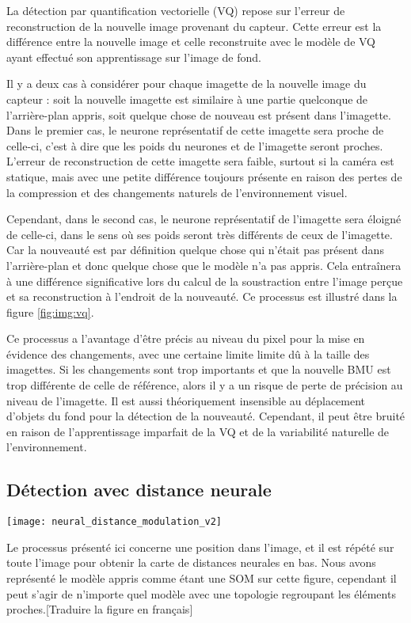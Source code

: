 	La détection par quantification vectorielle (VQ) repose sur l'erreur de reconstruction de la nouvelle image provenant du capteur. Cette erreur est la différence entre la nouvelle image et celle reconstruite avec le modèle de VQ ayant effectué son apprentissage sur l'image de fond.

	Il y a deux cas à considérer pour chaque imagette de la nouvelle image du capteur : soit la nouvelle imagette est similaire à une partie quelconque de l'arrière-plan appris, soit quelque chose de nouveau est présent dans l'imagette. Dans le premier cas, le neurone représentatif de cette imagette sera proche de celle-ci, c'est à dire que les poids du neurones et de l'imagette seront proches. L'erreur de reconstruction de cette imagette sera faible, surtout si la caméra est statique, mais avec une petite différence toujours présente en raison des pertes de la compression et des changements naturels de l'environnement visuel.
	
	Cependant, dans le second cas, le neurone représentatif de l'imagette sera éloigné de celle-ci, dans le sens où ses poids seront très différents de ceux de l'imagette. Car la nouveauté est par définition quelque chose qui n'était pas présent dans l'arrière-plan et donc quelque chose que le modèle n'a pas appris. Cela entraînera à une différence significative lors du calcul de la soustraction entre l'image perçue et sa reconstruction à l'endroit de la nouveauté. Ce processus est illustré dans la figure \ref{fig:img:vq}. 

	Ce processus a l'avantage d'être précis au niveau du pixel pour la mise en évidence des changements, avec une certaine limite limite dû à la taille des imagettes. Si les changements sont trop importants et que la nouvelle BMU est trop différente de celle de référence, alors il y a un risque de perte de précision au niveau de l'imagette. Il est aussi théoriquement insensible au déplacement d'objets du fond pour la détection de la nouveauté. Cependant, il peut être bruité en raison de l'apprentissage imparfait de la VQ et de la variabilité naturelle de l'environnement.

	\subsection{Détection avec distance neurale}

	\begin{figureth}
		\texttt{[image: neural\_distance\_modulation\_v2]}
		\caption[Détection de nouveauté avec topologie]{Le processus présenté ici concerne une position dans l'image, et il est répété sur toute l'image pour obtenir la carte de distances neurales en bas. Nous avons représenté le modèle appris comme étant une SOM sur cette figure, cependant il peut s'agir de n'importe quel modèle avec une topologie regroupant les éléments proches.[Traduire la figure en français]}\label{fig:img:topo}
	\end{figureth}

